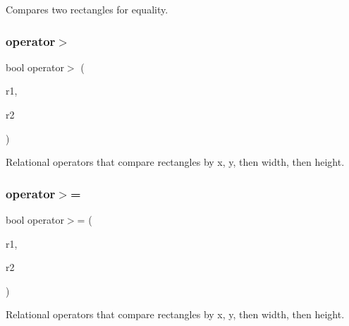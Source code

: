 Compares two rectangles for equality. 

\mbox{\label{classGRectangle_a99b0e23f34dced98f43fd0250c9cdf40}} 
\subsubsection{\texorpdfstring{operator$>$}{operator>}}
{\footnotesize\ttfamily bool operator$>$ (\begin{DoxyParamCaption}\item[{const \mbox{\hyperlink{classGRectangle}{G\+Rectangle}} \&}]{r1,  }\item[{const \mbox{\hyperlink{classGRectangle}{G\+Rectangle}} \&}]{r2 }\end{DoxyParamCaption})\hspace{0.3cm}{\ttfamily [friend]}}



Relational operators that compare rectangles by x, y, then width, then height. 

\mbox{\label{classGRectangle_a206b248cb2a1fdece41beb61e5d41904}} 
\subsubsection{\texorpdfstring{operator$>$=}{operator>=}}
{\footnotesize\ttfamily bool operator$>$= (\begin{DoxyParamCaption}\item[{const \mbox{\hyperlink{classGRectangle}{G\+Rectangle}} \&}]{r1,  }\item[{const \mbox{\hyperlink{classGRectangle}{G\+Rectangle}} \&}]{r2 }\end{DoxyParamCaption})\hspace{0.3cm}{\ttfamily [friend]}}



Relational operators that compare rectangles by x, y, then width, then height. 

